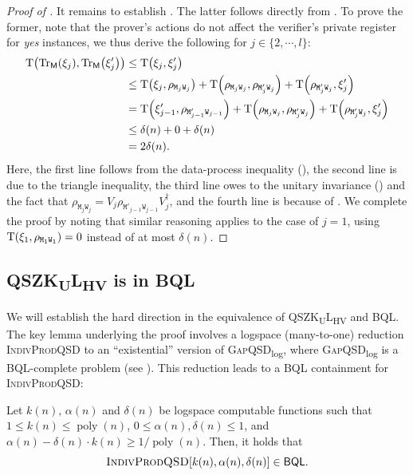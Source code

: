 \documentclass[10pt,a4paper]{article}
\numberwithin{equation}{section}
\numberwithin{figure}{section}
\newcommand{\QSZKULHV}{\texorpdfstring{\textnormal{\textsf{QSZK}\textsubscript{\textnormal{U}}\textsf{L}}\textsubscript{\textnormal{HV}}}\xspace}
\newcommand{\BQL}{\textnormal{\textsf{BQL}}\xspace}
\newcommand{\GapQSDlog}{\texorpdfstring{\textnormal{\textsc{GapQSD}\textsubscript{log}}}\xspace}
\newcommand{\IndivProdQSD}{\textnormal{\textsc{IndivProdQSD}}\xspace}
\DeclarePairedDelimiter\rbra{\lparen}{\rparen}
\newcommand{\Tr}{\mathrm{Tr}}
\newcommand{\td}{\mathrm{T}}
\DeclareMathOperator\poly{poly}
\newcommand{\sfM}{\mathsf{M}}
\newcommand{\ttM}{\mathtt{M}}
\newcommand{\ttW}{\mathtt{W}}
\begin{document}
\begin{proof}[Proof of ]
    It remains to establish . The latter follows directly from . To prove the former, note that the prover's actions do not affect the verifier's private register for \textit{yes} instances, we thus derive the following for $j \in \{2,\cdots,l\}$: 
    \begin{align*}
        \td\rbra*{\Tr_{\sfM}\rbra*{\xi_j}, \Tr_{\sfM}\rbra*{\xi'_j}} 
        &\leq \td\rbra*{\xi_j, \xi'_j} \\
        &\leq \td\rbra*{\xi_j, \rho_{\ttM_j\ttW_j}} + \td\rbra*{\rho_{\ttM_j\ttW_j},\rho_{\ttM'_j\ttW_j}} + \td\rbra*{\rho_{\ttM'_j\ttW_j}, \xi'_j} \\
        &= \td\rbra*{\xi'_{j-1}, \rho_{\ttM'_{j-1}\ttW_{j-1}}} + \td\rbra*{\rho_{\ttM_j\ttW_j},\rho_{\ttM'_j\ttW_j}} + \td\rbra*{\rho_{\ttM'_j\ttW_j}, \xi'_j}\\
        &\leq \delta(n) + 0 + \delta(n)\\
        &= 2\delta(n).
    \end{align*}
    Here, the first line follows from the data-process inequality (), the second line is due to the triangle inequality, the third line owes to the unitary invariance () and the fact that $\rho_{\ttM_j\ttW_j} = V_j \rho_{\ttM'_{j-1}\ttW_{j-1}} V_j^{\dagger}$, and the fourth line is because of . 
    We complete the proof by noting that similar reasoning applies to the case of $j=1$, using $\td\rbra*{\xi_1, \rho_{\ttM_1\ttW_1}} = 0$ instead of at most $\delta(n)$.
\end{proof}

\subsection{\QSZKULHV{} is in \BQL{}}
\label{subsec:QSZKL-in-BQL}

We will establish the hard direction in the equivalence of \QSZKULHV{} and \BQL{}. 
The key lemma underlying the proof involves a logspace (many-to-one) reduction  \IndivProdQSD{} to an ``existential'' version of \GapQSDlog{}, where \GapQSDlog{} is a \BQL{}-complete problem (see ). This reduction leads to a \BQL{} containment for \IndivProdQSD{}: 
\begin{lemma}[\IndivProdQSD{} is in \BQL{}]
    \label{lemma:IndivProdQSD-in-BQL}
    Let $k(n)$, $\alpha(n)$ and $\delta(n)$ be logspace computable functions such that $1 \leq k(n) \leq \poly(n)$, $0 \leq \alpha(n),\delta(n) \leq 1$, and $\alpha(n) - \delta(n) \cdot k(n) \geq 1/\poly(n)$. Then, it holds that
    \[ \IndivProdQSD[k(n),\alpha(n),\delta(n)] \in \BQL. \]
\end{lemma}
\end{document}
